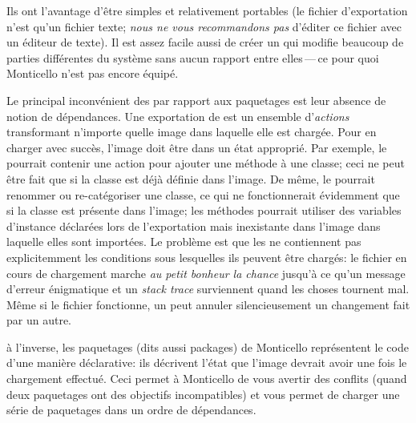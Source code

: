\documentclass[a4paper,10pt,twoside]{book}
\begin{document}
Ils ont l'avantage d'être simples et relativement portables (le fichier d'exportation 
n'est qu'un fichier texte; \emph{nous ne vous recommandons pas} d'éditer ce fichier 
avec un éditeur de texte).
Il est assez facile aussi de créer un \changeset qui modifie
beaucoup de parties différentes du système sans aucun rapport
entre elles\,---\,ce pour quoi Monticello n'est pas encore équipé.

Le principal inconvénient des \changesets par rapport aux paquetages 
est leur absence de notion de dépendances.
Une exportation de \changeset est un ensemble d'\emph{actions} transformant n'importe quelle
image dans laquelle elle est chargée. Pour en charger avec succès, l'image doit être
dans un état approprié.
Par exemple, le \changeset pourrait contenir une action pour ajouter une méthode à une
classe; ceci ne peut être fait que si la classe est déjà définie dans l'image.
De même, le \changeset pourrait renommer ou re-catégoriser une classe, ce qui ne 
fonctionnerait évidemment que si la classe est présente dans l'image; les méthodes
pourrait utiliser des variables d'instance déclarées lors de l'exportation mais
inexistante dans l'image dans laquelle elles sont importées.
Le problème est que les \changesets ne contiennent pas explicitemment les conditions 
sous lesquelles ils peuvent être chargés:
le fichier en cours de chargement marche \emph{au petit bonheur la chance} jusqu'à
ce qu'un message d'erreur énigmatique et un \emph{stack trace} surviennent
quand les choses tournent mal.
Même si le fichier fonctionne, un \changeset peut annuler silencieusement 
un changement fait par un autre.

à l'inverse, les paquetages (dits aussi packages) de Monticello représentent le code d'une manière 
déclarative: ils décrivent l'état que l'image devrait avoir une fois le chargement
effectué.
Ceci permet à Monticello de vous avertir des conflits (quand deux paquetages ont des
objectifs incompatibles)
et vous permet de charger une série de paquetages dans un ordre de dépendances.
\end{document}
